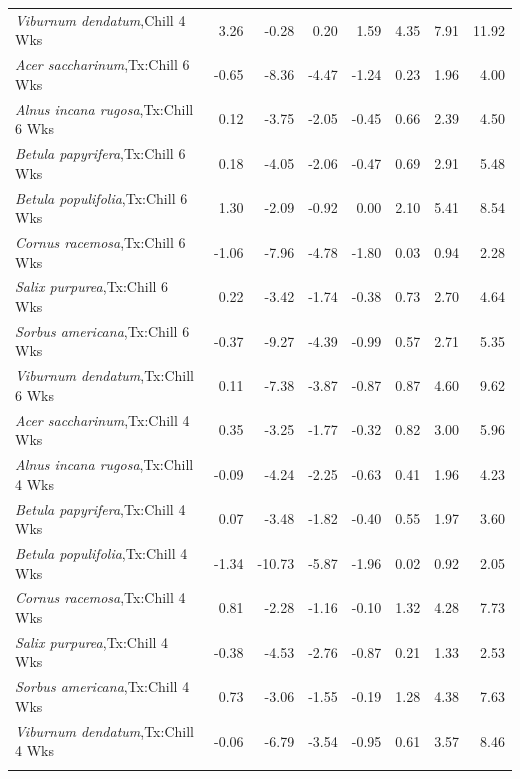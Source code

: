 \documentclass{article}\usepackage[]{graphicx}\usepackage[]{color}
\begin{document}
\begin{longtable}{lrrrrrrr}
  \textit{Viburnum dendatum},Chill 4 Wks & 3.26 & -0.28 & 0.20 & 1.59 & 4.35 & 7.91 & 11.92 \\ 
  \textit{Acer saccharinum},Tx:Chill 6 Wks & -0.65 & -8.36 & -4.47 & -1.24 & 0.23 & 1.96 & 4.00 \\ 
  \textit{Alnus incana rugosa},Tx:Chill 6 Wks & 0.12 & -3.75 & -2.05 & -0.45 & 0.66 & 2.39 & 4.50 \\ 
  \textit{Betula papyrifera},Tx:Chill 6 Wks & 0.18 & -4.05 & -2.06 & -0.47 & 0.69 & 2.91 & 5.48 \\ 
  \textit{Betula populifolia},Tx:Chill 6 Wks & 1.30 & -2.09 & -0.92 & 0.00 & 2.10 & 5.41 & 8.54 \\ 
  \textit{Cornus racemosa},Tx:Chill 6 Wks & -1.06 & -7.96 & -4.78 & -1.80 & 0.03 & 0.94 & 2.28 \\ 
  \textit{Salix purpurea},Tx:Chill 6 Wks & 0.22 & -3.42 & -1.74 & -0.38 & 0.73 & 2.70 & 4.64 \\ 
  \textit{Sorbus americana},Tx:Chill 6 Wks & -0.37 & -9.27 & -4.39 & -0.99 & 0.57 & 2.71 & 5.35 \\ 
  \textit{Viburnum dendatum},Tx:Chill 6 Wks & 0.11 & -7.38 & -3.87 & -0.87 & 0.87 & 4.60 & 9.62 \\ 
  \textit{Acer saccharinum},Tx:Chill 4 Wks & 0.35 & -3.25 & -1.77 & -0.32 & 0.82 & 3.00 & 5.96 \\ 
  \textit{Alnus incana rugosa},Tx:Chill 4 Wks & -0.09 & -4.24 & -2.25 & -0.63 & 0.41 & 1.96 & 4.23 \\ 
  \textit{Betula papyrifera},Tx:Chill 4 Wks & 0.07 & -3.48 & -1.82 & -0.40 & 0.55 & 1.97 & 3.60 \\ 
  \textit{Betula populifolia},Tx:Chill 4 Wks & -1.34 & -10.73 & -5.87 & -1.96 & 0.02 & 0.92 & 2.05 \\ 
  \textit{Cornus racemosa},Tx:Chill 4 Wks & 0.81 & -2.28 & -1.16 & -0.10 & 1.32 & 4.28 & 7.73 \\ 
  \textit{Salix purpurea},Tx:Chill 4 Wks & -0.38 & -4.53 & -2.76 & -0.87 & 0.21 & 1.33 & 2.53 \\ 
  \textit{Sorbus americana},Tx:Chill 4 Wks & 0.73 & -3.06 & -1.55 & -0.19 & 1.28 & 4.38 & 7.63 \\ 
  \textit{Viburnum dendatum},Tx:Chill 4 Wks & -0.06 & -6.79 & -3.54 & -0.95 & 0.61 & 3.57 & 8.46 \\ 
   \hline
\hline
\label{tab:suppmodmeri}
\end{longtable}
\end{document}
